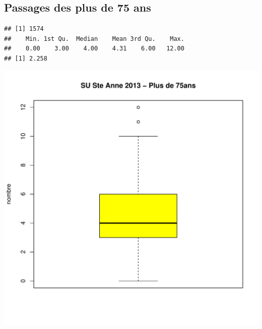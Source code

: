 \documentclass[12pt,english,french,twoside]{report}\usepackage[]{graphicx}\usepackage[]{color}
\makeatletter
\def\maxwidth{ %
  \ifdim\Gin@nat@width>\linewidth
    \linewidth
  \else
    \Gin@nat@width
  \fi
}
\newenvironment{kframe}{%
 \def\at@end@of@kframe{}%
 \ifinner\ifhmode%
  \def\at@end@of@kframe{\end{minipage}}%
  \begin{minipage}{\columnwidth}%
 \fi\fi%
 \def\FrameCommand##1{\hskip\@totalleftmargin \hskip-\fboxsep
 \colorbox{shadecolor}{##1}\hskip-\fboxsep
     \hskip-\linewidth \hskip-\@totalleftmargin \hskip\columnwidth}%
 \MakeFramed {\advance\hsize-\width
   \@totalleftmargin\z@ \linewidth\hsize
   \@setminipage}}%
 {\par\unskip\endMakeFramed%
 \at@end@of@kframe}
\newenvironment{knitrout}{}{} %
\makeatother
\begin{document}
\begin{knitrout}
\end{knitrout}



\subsection{Passages des plus de 75 ans}

\begin{knitrout}
\color{fgcolor}\begin{kframe}
\begin{verbatim}
## [1] 1574
##    Min. 1st Qu.  Median    Mean 3rd Qu.    Max. 
##    0.00    3.00    4.00    4.31    6.00   12.00
## [1] 2.258
\end{verbatim}
\end{kframe}
\includegraphics[width=\maxwidth]{figure/stAnne_sup75_passages1} 


\end{knitrout}
\end{document}

